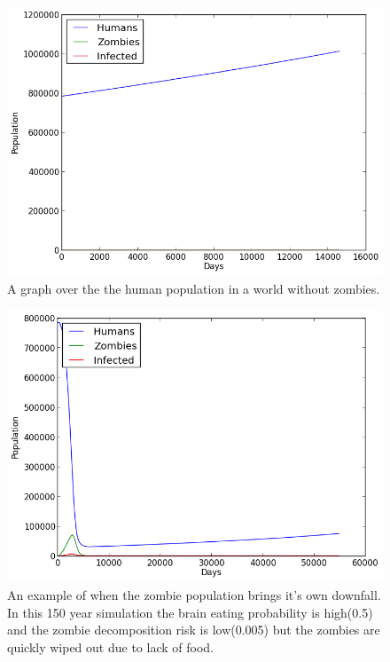 \documentclass{report}
\begin{document}
\begin{figure}
\includegraphics[width=350pt]{plots/withoutzombies}
\caption{A graph over the the human population in a world without zombies.}
\label{withoutzombies}
\end{figure}
\begin{figure}
\includegraphics[width=350pt]{plots/zombieswipedout}
\caption{An example of when the zombie population brings it's own downfall. In this 150 year simulation the brain eating probability is high(0.5) and the zombie decomposition risk is low(0.005) but the zombies are quickly wiped out due to lack of food.}
\label{zombieswipedout}
\end{figure}



\end{document}
